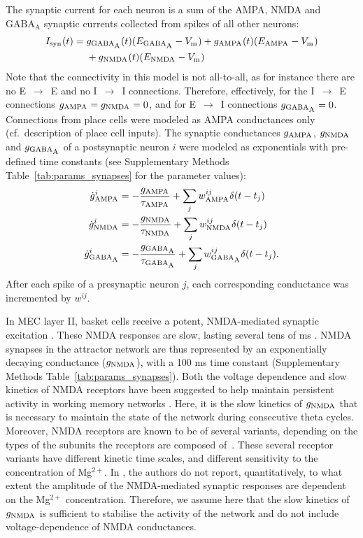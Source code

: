\documentclass[a4paper,12pt]{article}
\newcommand{\ssc}[3]{\ensuremath{#1_{\text{#2}_{\text{#3}}}}}
\newcommand{\Vm}       {\ssc{V}      {m}     {}}
\newcommand{\Isyn}     {\ssc{I}      {syn}   {}}
\newcommand{\gGABAA}   {\ssc{g}      {\scriptsize{GABA}}{\scriptsize{A}}}
\newcommand{\EGABAA}   {\ssc{E}      {\scriptsize{GABA}}{\scriptsize{A}}}
\newcommand{\tauGABAA} {\ssc{\tau}   {\scriptsize{GABA}}{\scriptsize{A}}}
\newcommand{\gAMPA}    {\ssc{g}      {\scriptsize{AMPA}}{}}
\newcommand{\EAMPA}    {\ssc{E}      {\scriptsize{AMPA}}{}}
\newcommand{\tauAMPA}  {\ssc{\tau}   {\scriptsize{AMPA}}{}}
\newcommand{\gNMDA}    {\ssc{g}      {\scriptsize{NMDA}}{}}
\newcommand{\ENMDA}    {\ssc{E}      {\scriptsize{NMDA}}{}}
\newcommand{\tauNMDA}  {\ssc{\tau}   {\scriptsize{NMDA}}{}}
\newcommand{\dgAMPA} {\ssc{\dot{g}}{\scriptsize{AMPA}}{}}
\newcommand{\dgGABAA}{\ssc{\dot{g}}{\scriptsize{GABA}}{\scriptsize{A}}}
\newcommand{\dgNMDA} {\ssc{\dot{g}}{\scriptsize{NMDA}}{}}
\newcommand{\wAMPA   }{\ssc{w}      {\scriptsize{AMPA}}{}}
\newcommand{\wNMDA   }{\ssc{w}      {\scriptsize{NMDA}}{}}
\newcommand{\wGABAA  }{\ssc{w}      {\scriptsize{GABA}}{\scriptsize{A}}}
\begin{document}
The synaptic current for each neuron is a sum of the AMPA, NMDA and
$\text{GABA}_{\text{A}}$ synaptic currents collected from spikes of all other
neurons:
\begin{align}
    \Isyn(t)  = {} & \gGABAA(t) (\EGABAA - \Vm) + \gAMPA(t) (\EAMPA - \Vm) \notag \\
                & + \gNMDA(t) (\ENMDA - \Vm)
    \label{eq:I_syn}
\end{align}               
Note that the connectivity in this model is not all-to-all, as for instance
there are no E~$\rightarrow$~E and no I~$\rightarrow$~I connections. Therefore,
effectively, for the I~$\rightarrow$~E connections $\gAMPA = \gNMDA = 0$, and
for E~$\rightarrow$~I connections $\gGABAA = 0$. Connections from place cells
were modeled as AMPA conductances only (cf.\ description of place cell inputs).
The synaptic conductances $\gAMPA$, $\gNMDA$ and $\gGABAA$ of a postsynaptic
neuron $i$ were modeled as exponentials with pre-defined time constants (see
Supplementary Methods Table~\ref{tab:params_synapses} for the parameter values):
\begin{align}
    \dgAMPA^i  &=  -\frac{\gAMPA }{\tauAMPA}  + \sum_j \wAMPA^{ij}  \delta(t - t_j)\notag  \\
    \dgNMDA^i  &=  -\frac{\gNMDA }{\tauNMDA}  + \sum_j \wNMDA^{ij}  \delta(t - t_j)\notag  \\
    \dgGABAA^i &=  -\frac{\gGABAA}{\tauGABAA} + \sum_j \wGABAA^{ij} \delta(t - t_j).
    \label{eq:dgSyn}
\end{align}
After each spike of a presynaptic neuron $j$, each corresponding conductance
was incremented by $w^{ij}$.

In MEC layer II, basket cells receive a potent, NMDA-mediated synaptic
excitation \citep{JONES:1993je}. These NMDA responses are slow, lasting several
tens of ms \citep{JONES:1993je}. NMDA synapses in the attractor network are thus
represented by an exponentially decaying conductance ($\gNMDA$), with a 100 ms
time constant (Supplementary Methods Table~\ref{tab:params_synapses}).
Both the voltage dependence and slow kinetics of NMDA receptors have been
suggested to help maintain persistent activity in working memory networks
\citep{Wang:1999wt}.  Here, it is the slow kinetics of $\gNMDA$ that is
necessary to maintain the state of the network during consecutive theta cycles.
Moreover, NMDA receptors are known to be of several variants, depending on the
types of the subunits the receptors are composed of~\citep{Paoletti:2013ht}.
These several receptor variants have different kinetic time scales, and
different sensitivity to the concentration of Mg$^{2+}$. In
\citep{JONES:1993je}, the authors
do not report, quantitatively, to what extent the amplitude of the
NMDA-mediated synaptic responses are dependent on the Mg$^{2+}$ concentration.
Therefore, we assume here that the slow kinetics of $\gNMDA$ is sufficient to
stabilise the activity of the network and do not include voltage-dependence of
NMDA conductances.
\end{document}
